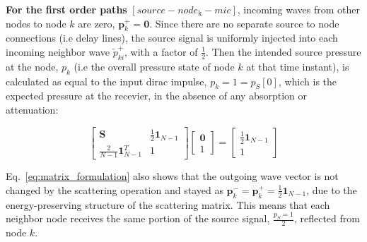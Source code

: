 \documentclass[journal]{IEEEtran}
\begin{document}
\textbf{For the first order paths} $[source-node_{\text{k}}-mic]$, incoming waves from other nodes to node \(k\) are zero, $\mathbf{p}_k^+ = \mathbf{0}$. Since there are no separate source to node connections (i.e delay lines), the source signal is uniformly injected into each incoming neighbor wave $\tilde p_{ki}^+$, with a factor of $\frac{1}{2}$. 
Then the intended source pressure at the node, $p_{k}$ (i.e the overall pressure state of node \(k\) at that time instant), is calculated as equal to the input dirac impulse,  $p_k=1=p_{S}[0]$, which is the expected pressure at the recevier, in the absence of any absorption or attenuation:

\begin{equation}
    \label{eq:matrix_formulation}
\begin{bmatrix}
    \mathbf{S} & \frac{1}{2}\mathbf{1}_{N-1} \\
    \frac{2}{N-1}\mathbf{1}_{N-1}^T & 1
\end{bmatrix}
\begin{bmatrix}
\mathbf{0} \\
1
\end{bmatrix}
=
\begin{bmatrix}
\frac{1}{2}\mathbf{1}_{N-1} \\
1
\end{bmatrix}
\end{equation}

Eq.~\ref{eq:matrix_formulation} also shows that the outgoing wave vector is not changed by the scattering operation and stayed as $\mathbf{p}_k^- = \mathbf{p}_k^+ = \frac{1}{2}\mathbf{1}_{N-1}$,
due to the energy-preserving structure of the scattering matrix. This means that each neighbor node receives the same portion of the source signal,  $\frac{p_S=1}{2}$, reflected from node \(k\). 
\end{document}

